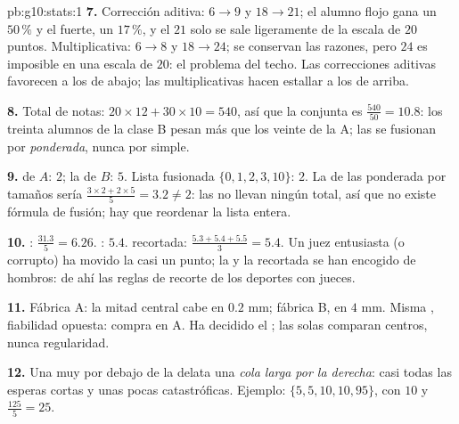 \begin{solution}{pb:g10:stats:1}
\textbf{7.} Corrección aditiva: $6 \to 9$ y $18 \to 21$; el alumno flojo
gana un $50\,\%$ y el fuerte, un $17\,\%$, y el $21$ solo se sale
ligeramente de la escala de $20$ puntos. Multiplicativa: $6 \to 8$ y
$18 \to 24$; se conservan las razones, pero $24$ es imposible en una
escala de $20$: el problema del techo. Las correcciones aditivas favorecen
a los de abajo; las multiplicativas hacen estallar a los de arriba.

\textbf{8.} Total de notas: $20 \times 12 + 30 \times 10 = 540$, así que
la  conjunta es $\frac{540}{50} = 10.8$: los treinta alumnos de la
clase B pesan más que los veinte de la A; las  se fusionan por 
\emph{ponderada}, nunca por  simple.

\textbf{9.}  de $A$: $2$; la de $B$: $5$. Lista fusionada
$\{0, 1, 2, 3, 10\}$:  $2$. La  de las  ponderada por
tamaños sería $\frac{3 \times 2 + 2 \times 5}{5} = 3.2 \neq 2$: las
 no llevan ningún total, así que no existe fórmula de fusión; hay
que reordenar la lista entera.

\textbf{10.} : $\frac{31.3}{5} = 6.26$. : $5.4$. 
recortada: $\frac{5.3 + 5.4 + 5.5}{3} = 5.4$. Un juez entusiasta (o
corrupto) ha movido la  casi un punto; la  y la 
recortada se han encogido de hombros: de ahí las reglas de recorte de los
deportes con jueces.

\textbf{11.} Fábrica A: la mitad central cabe en $0.2$ mm; fábrica B, en
$4$ mm. Misma , fiabilidad opuesta: compra en A. Ha decidido el
; las  solas comparan centros, nunca
regularidad.

\textbf{12.} Una  muy por debajo de la  delata una
\emph{cola larga por la derecha}: casi todas las esperas cortas y unas
pocas catastróficas. Ejemplo: $\{5, 5, 10, 10, 95\}$, con  $10$ y
 $\frac{125}{5} = 25$.


\end{solution}
